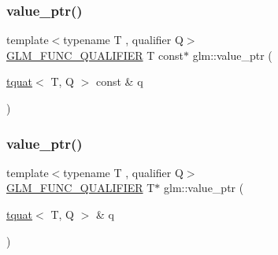 \subsubsection{\texorpdfstring{value\+\_\+ptr()}{value\_ptr()}\hspace{0.1cm}{\footnotesize\ttfamily [26/27]}}
{\footnotesize\ttfamily template$<$typename T , qualifier Q$>$ \\
\mbox{\hyperlink{setup_8hpp_a33fdea6f91c5f834105f7415e2a64407}{G\+L\+M\+\_\+\+F\+U\+N\+C\+\_\+\+Q\+U\+A\+L\+I\+F\+I\+ER}} T const$\ast$ glm\+::value\+\_\+ptr (\begin{DoxyParamCaption}\item[{\mbox{\hyperlink{structglm_1_1tquat}{tquat}}$<$ T, Q $>$ const \&}]{q }\end{DoxyParamCaption})}

\mbox{\label{group__gtc__type__ptr_ga38e914875e288a10c99139869be4426a}} 
\subsubsection{\texorpdfstring{value\+\_\+ptr()}{value\_ptr()}\hspace{0.1cm}{\footnotesize\ttfamily [27/27]}}
{\footnotesize\ttfamily template$<$typename T , qualifier Q$>$ \\
\mbox{\hyperlink{setup_8hpp_a33fdea6f91c5f834105f7415e2a64407}{G\+L\+M\+\_\+\+F\+U\+N\+C\+\_\+\+Q\+U\+A\+L\+I\+F\+I\+ER}} T$\ast$ glm\+::value\+\_\+ptr (\begin{DoxyParamCaption}\item[{\mbox{\hyperlink{structglm_1_1tquat}{tquat}}$<$ T, Q $>$ \&}]{q }\end{DoxyParamCaption})}

